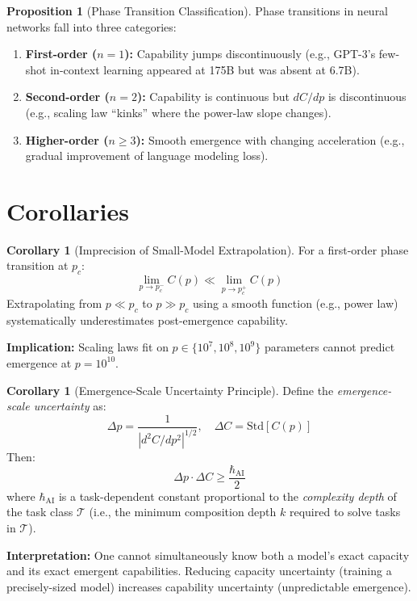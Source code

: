 \documentclass[12pt]{article}
\newcommand{\Tcal}{\mathcal{T}}
\theoremstyle{definition}
\newtheorem{corollary}[definition]{Corollary}
\newtheorem{proposition}[definition]{Proposition}
\theoremstyle{remark}
\begin{document}
\begin{proposition}[Phase Transition Classification]\label{prop:class}
Phase transitions in neural networks fall into three categories:
\begin{enumerate}
  \item \textbf{First-order ($n=1$):} Capability jumps discontinuously (e.g., GPT-3's few-shot in-context learning appeared at 175B but was absent at 6.7B).
  \item \textbf{Second-order ($n=2$):} Capability is continuous but $dC/dp$ is discontinuous (e.g., scaling law ``kinks'' where the power-law slope changes).
  \item \textbf{Higher-order ($n \geq 3$):} Smooth emergence with changing acceleration (e.g., gradual improvement of language modeling loss).
\end{enumerate}
\end{proposition}

\section{Corollaries}

\begin{corollary}[Imprecision of Small-Model Extrapolation]\label{cor:extrapolation}
For a first-order phase transition at $p_c$:
\begin{equation}
\lim_{p \to p_c^-} C(p) \ll \lim_{p \to p_c^+} C(p)
\end{equation}
Extrapolating from $p \ll p_c$ to $p \gg p_c$ using a smooth function (e.g., power law) systematically underestimates post-emergence capability.

\textbf{Implication:} Scaling laws fit on $p \in \{10^7, 10^8, 10^9\}$ parameters cannot predict emergence at $p = 10^{10}$.
\end{corollary}

\begin{corollary}[Emergence-Scale Uncertainty Principle]\label{cor:uncertainty}
Define the \emph{emergence-scale uncertainty} as:
\begin{equation}
\Delta p = \frac{1}{|d^2C/dp^2|^{1/2}}, \quad \Delta C = \mathrm{Std}[C(p)]
\end{equation}
Then:
\begin{equation}
\Delta p \cdot \Delta C \geq \frac{\hbar_{\mathrm{AI}}}{2}
\end{equation}
where $\hbar_{\mathrm{AI}}$ is a task-dependent constant proportional to the \emph{complexity depth} of the task class $\Tcal$ (i.e., the minimum composition depth $k$ required to solve tasks in $\Tcal$).

\textbf{Interpretation:} One cannot simultaneously know both a model's exact capacity and its exact emergent capabilities. Reducing capacity uncertainty (training a precisely-sized model) increases capability uncertainty (unpredictable emergence).
\end{corollary}
\end{document}
